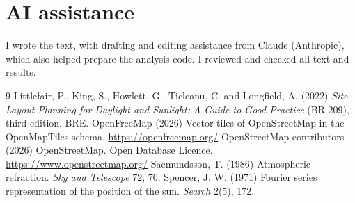\documentclass[11pt,a4paper]{article}
\begin{document}
\section*{AI assistance}
I wrote the text, with drafting and editing assistance from Claude (Anthropic), which also helped prepare the analysis code. I reviewed and checked all text and results.

\begin{thebibliography}{9}
 Littlefair, P., King, S., Howlett, G., Ticleanu, C. and Longfield, A. (2022) \textit{Site Layout Planning for Daylight and Sunlight: A Guide to Good Practice} (BR 209), third edition. BRE.
 OpenFreeMap (2026) Vector tiles of OpenStreetMap in the OpenMapTiles schema. \url{https://openfreemap.org/}
 OpenStreetMap contributors (2026) OpenStreetMap. Open Database Licence. \url{https://www.openstreetmap.org/}
 Saemundsson, T. (1986) Atmospheric refraction. \textit{Sky and Telescope} 72, 70.
 Spencer, J. W. (1971) Fourier series representation of the position of the sun. \textit{Search} 2(5), 172.
\end{thebibliography}
\end{document}
